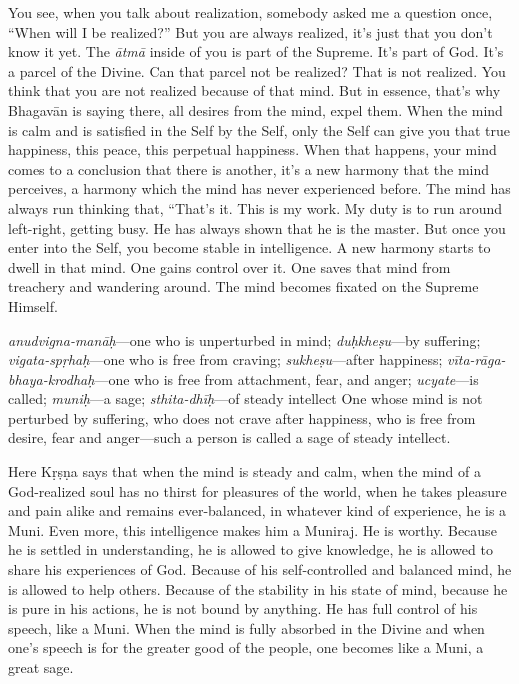 You see, when you talk about realization, somebody asked me a question once, “When will I be realized?” But you are always realized, it’s just that you don’t know it yet. The \textit{ātmā} inside of you is part of the Supreme. It’s part of God. It’s a parcel of the Divine. Can that parcel not be realized? That is not realized. You think that you are not realized because of that mind. But in essence, that’s why Bhagavān is saying there, all desires from the mind, expel them. When the mind is calm and is satisfied in the Self by the Self, only the Self can give you that true happiness, this peace, this perpetual happiness. When that happens, your mind comes to a conclusion that there is another, it’s a new harmony that the mind perceives, a harmony which the mind has never experienced before. The mind has always run thinking that, “That’s it. This is my work. My duty is to run around left-right, getting busy. He has always shown that he is the master. But once you enter into the Self, you become stable in intelligence. A new harmony starts to dwell in that mind. One gains control over it. One saves that mind from treachery and wandering around. The mind becomes fixated on the Supreme Himself.

{%
  \textit{anudvigna-manāḥ}---one who is unperturbed in mind; 
  \textit{duḥkheṣu}---by suffering; 
  \textit{vigata-spṛhaḥ}---one who is free from craving; 
  \textit{sukheṣu}---after happiness; 
  \textit{vīta-rāga-bhaya-krodhaḥ}---one who is free from attachment, fear, and anger; 
  \textit{ucyate}---is called; 
  \textit{muniḥ}---a sage; 
  \textit{sthita-dhīḥ}---of steady intellect
}
{%
  One whose mind is not perturbed by suffering, who does not crave after happiness, who is free from desire, fear and anger—such a person is called a sage of steady intellect.
}

Here Kṛṣṇa says that when the mind is steady and calm, when the mind of a God-realized soul has no thirst for pleasures of the world, when he takes pleasure and pain alike and remains ever-balanced, in whatever kind of experience, he is a Muni. Even more, this intelligence makes him a Muniraj. He is worthy. Because he is settled in understanding, he is allowed to give knowledge, he is allowed to share his experiences of God. Because of his self-controlled and balanced mind, he is allowed to help others. Because of the stability in his state of mind, because he is pure in his actions, he is not bound by anything. He has full control of his speech, like a Muni. When the mind is fully absorbed in the Divine and when one’s speech is for the greater good of the people, one becomes like a Muni, a great sage.

